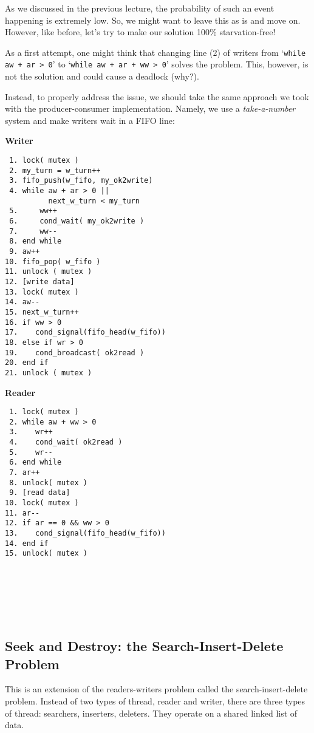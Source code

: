 As we discussed in the previous lecture, the probability of such an event happening is extremely low.
So, we might want to leave this as is and move on.
However, like before, let's try to make our solution 100\% starvation-free!

As a first attempt, one might think that changing line (2) of writers from `\texttt{while aw + ar > 0}' to `\texttt{while aw + ar + ww > 0}' solves the problem.
This, however, is not the solution and could cause a deadlock (why?).

Instead, to properly address the issue, we should take the same approach we took with the producer-consumer implementation.
Namely, we use a \emph{take-a-number} system and make writers wait in a FIFO line:

\begin{multicols}{2}
    \textbf{Writer}\vspace{-2em}
    \begin{verbatim}
 1. lock( mutex )
 2. my_turn = w_turn++
 3. fifo_push(w_fifo, my_ok2write)
 4. while aw + ar > 0 ||
          next_w_turn < my_turn
 5.     ww++
 6.     cond_wait( my_ok2write )
 7.     ww--
 8. end while
 9. aw++
10. fifo_pop( w_fifo )
11. unlock ( mutex )
12. [write data]
13. lock( mutex )
14. aw--
15. next_w_turn++
16. if ww > 0
17.    cond_signal(fifo_head(w_fifo))
18. else if wr > 0
19.    cond_broadcast( ok2read )
20. end if
21. unlock ( mutex )
    \end{verbatim}
    \columnbreak
    \textbf{Reader}\vspace{-2em}
    \begin{verbatim}
 1. lock( mutex )
 2. while aw + ww > 0
 3.    wr++
 4.    cond_wait( ok2read )
 5.    wr--
 6. end while
 7. ar++
 8. unlock( mutex )
 9. [read data]
10. lock( mutex )
11. ar--
12. if ar == 0 && ww > 0
13.    cond_signal(fifo_head(w_fifo))
14. end if
15. unlock( mutex )







    \end{verbatim}
\end{multicols}
\vspace{-2em}

\subsection*{Seek and Destroy: the Search-Insert-Delete Problem}

This is an extension of the readers-writers problem called the search-insert-delete problem. Instead of two types of thread, reader and writer, there are three types of thread: searchers, inserters, deleters. They operate on a shared linked list of data.

